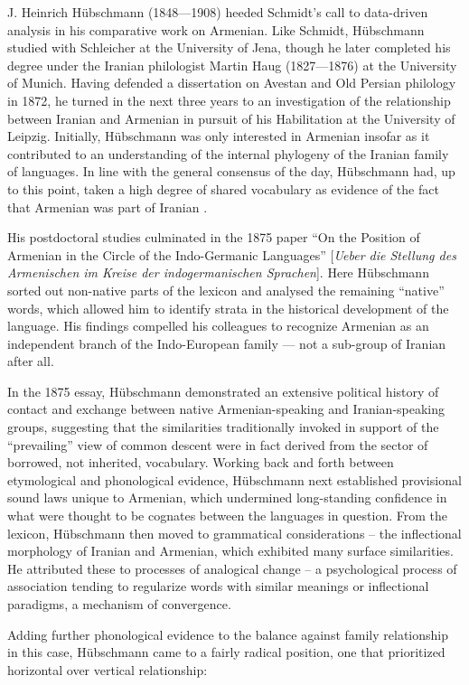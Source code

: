 \documentclass[output=paper]{langscibook}
\begin{document}
J. Heinrich Hübschmann (1848—1908) heeded Schmidt's call to data-driven analysis in his comparative work on Armenian. Like Schmidt, Hübschmann studied with Schleicher at the University of Jena, though he later completed his degree under the Iranian philologist Martin Haug (1827—1876) at the University of Munich. Having defended a dissertation on Avestan and Old Persian philology in 1872, he turned in the next three years to an investigation of the relationship between Iranian and Armenian in pursuit of his Habilitation at the University of Leipzig. Initially, Hübschmann was only interested in Armenian insofar as it contributed to an understanding of the internal phylogeny of the Iranian family of languages. In line with the general consensus of the day, Hübschmann had, up to this point, taken a high degree of shared vocabulary as evidence of the fact that Armenian was part of Iranian \citep{Schmitt1976}.

His postdoctoral studies culminated in the 1875 paper ``On the Position of Armenian in the Circle of the Indo-Germanic Languages'' [\emph{Ueber die Stellung des Armenischen im Kreise der indogermanischen Sprachen}]. Here Hübschmann sorted out non-native parts of the lexicon and analysed the remaining ``native'' words, which allowed him to identify strata in the historical development of the language. His findings compelled his colleagues to recognize Armenian as an independent branch of the Indo-European family — not a sub-group of Iranian after all.

In the 1875 essay, Hübschmann demonstrated an extensive political history of contact and exchange between native Armenian-speaking and Iranian-speaking groups, suggesting that the similarities traditionally invoked in support of the ``prevailing'' view of common descent were in fact derived from the sector of borrowed, not inherited, vocabulary. Working back and forth between etymological and phonological evidence, Hübschmann next established provisional sound laws unique to Armenian, which undermined long-standing confidence in what were thought to be cognates between the languages in question. From the lexicon, Hübschmann then moved to grammatical considerations – the inflectional morphology of Iranian and Armenian, which exhibited many surface similarities. He attributed these to processes of analogical change – a psychological process of association tending to regularize words with similar meanings or inflectional paradigms, a mechanism of convergence.

Adding further phonological evidence to the balance against family relationship in this case, Hübschmann came to a fairly radical position, one that prioritized horizontal over vertical relationship:
\end{document}
